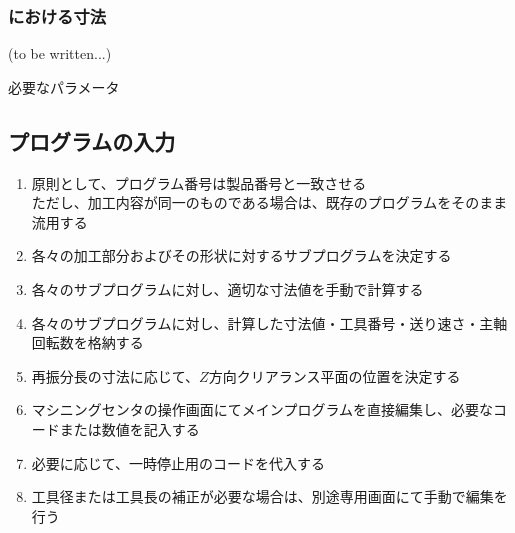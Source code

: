 \subsubsection{\TanmenZaguri における寸法\TBW}
(to be written...)
\begin{Parameter}{必要なパラメータ}
\PMEndFaceBoringCornerR{}\\
\ACOD
\end{Parameter}


\clearpage
\subsection{プログラムの入力}
\begin{enumerate}
\item 原則として、プログラム番号は製品番号と一致させる\\
ただし、加工内容が同一のものである場合は、既存のプログラムをそのまま流用する
\item 各々の加工部分およびその形状に対するサブプログラムを決定する
\item 各々のサブプログラムに対し、適切な寸法値を手動で計算する
\item 各々のサブプログラムに対し、計算した寸法値・工具番号・送り速さ・主軸回転数を格納する
\item {}再振分長の寸法に応じて、$Z$方向クリアランス平面の位置を決定する
\item マシニングセンタの操作画面にてメインプログラムを直接編集し、必要なコードまたは数値を記入する
\item 必要に応じて、一時停止用のコードを代入する
\item {}工具径または工具長の補正が必要な場合は、別途専用画面にて手動で編集を行う
\end{enumerate}


